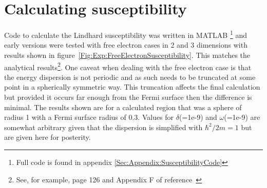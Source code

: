 \section{Calculating susceptibility}
    \label{Sec:Exp:Susceptibility}

Code to calculate the Lindhard susceptibility was written in MATLAB \footnote{Full code is found in appendix \ref{Sec:Appendix:SusceptibilityCode}} and early versions were tested with free electron cases in 2 and 3 dimensions with results shown in figure~\ref{Fig:Exp:FreeElectronSusceptibility}. This matches the analytical results\footnote{See, for example, page 126 and Appendix F of reference~\cite{Dressel2002}}. One caveat when dealing with the free electron case is that the energy dispersion is not periodic and as such needs to be truncated at some point in a spherically symmetric way. This truncation affects the final calculation but provided it occurs far enough from the Fermi surface then the difference is minimal. The results shown are for a calculated region that was a sphere of radius 1 with a Fermi surface radius of 0.3. Values for $\delta$(=1e-9) and $\omega$(=1e-9) are somewhat arbitrary given that the dispersion is simplified with $\hbar^2/2m = 1$ but are given here for posterity. 

